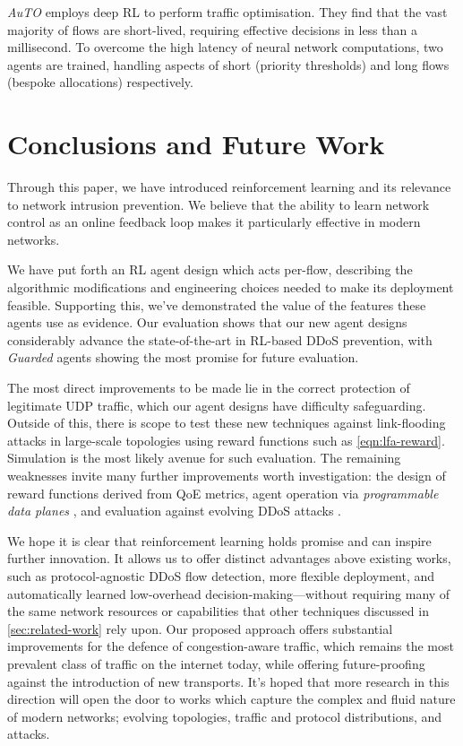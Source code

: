 \documentclass[10pt, times, conference, letterpaper]{IEEEtran}
\begin{document}
\emph{AuTO} \cite{DBLP:conf/sigcomm/ChenL0L18} employs deep RL to perform traffic optimisation.
They find that the vast majority of flows are short-lived, requiring effective decisions in less than a millisecond.
To overcome the high latency of neural network computations, two agents are trained, handling aspects of short (priority thresholds) and long flows (bespoke allocations) respectively.


\section{Conclusions and Future Work}
Through this paper, we have introduced reinforcement learning and its relevance to network intrusion prevention.
We believe that the ability to learn network control as an online feedback loop makes it particularly effective in modern networks.

We have put forth an RL agent design which acts per-flow, describing the algorithmic modifications and engineering choices needed to make its deployment feasible.
Supporting this, we've demonstrated the value of the features these agents use as evidence.
Our evaluation shows that our new agent designs considerably advance the state-of-the-art in RL-based DDoS prevention, with \emph{Guarded} agents showing the most promise for future evaluation.

The most direct improvements to be made lie in the correct protection of legitimate UDP traffic, which our agent designs have difficulty safeguarding.
Outside of this, there is scope to test these new techniques against link-flooding attacks in large-scale topologies using reward functions such as \cref{eqn:lfa-reward}.
Simulation is the most likely avenue for such evaluation.
The remaining weaknesses invite many further improvements worth investigation: the design of reward functions derived from QoE metrics, agent operation via \emph{programmable data planes} \cite{DBLP:conf/ancs/JouetP17}, and evaluation against evolving DDoS attacks \cite{DBLP:conf/spw/KangGS16}.

We hope it is clear that reinforcement learning holds promise and can inspire further innovation.
It allows us to offer distinct advantages above existing works, such as protocol-agnostic DDoS flow detection, more flexible deployment, and automatically learned low-overhead decision-making---without requiring many of the same network resources or capabilities that other techniques discussed in \cref{sec:related-work} rely upon.
Our proposed approach offers substantial improvements for the defence of congestion-aware traffic, which remains the most prevalent class of traffic on the internet today, while offering future-proofing against the introduction of new transports.
It's hoped that more research in this direction will open the door to works which capture the complex and fluid nature of modern networks; evolving topologies, traffic and protocol distributions, and attacks.
\end{document}
